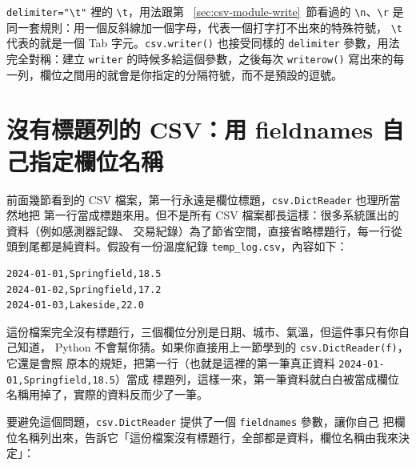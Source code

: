 
\texttt{delimiter="\textbackslash t"} 裡的 \texttt{\textbackslash t}，用法跟第
~\ref{sec:csv-module-write}~節看過的 \texttt{\textbackslash n}、\texttt{\textbackslash r}
是同一套規則：用一個反斜線加一個字母，代表一個打字打不出來的特殊符號，
\texttt{\textbackslash t} 代表的就是一個 Tab 字元。\texttt{csv.writer()} 也接受同樣的
\texttt{delimiter}
參數，用法完全對稱：建立 \texttt{writer} 的時候多給這個參數，之後每次 \texttt{writerow()}
寫出來的每一列，欄位之間用的就會是你指定的分隔符號，而不是預設的逗號。


\section{沒有標題列的 CSV：用 fieldnames 自己指定欄位名稱}
\label{sec:csv-no-header}

前面幾節看到的 CSV 檔案，第一行永遠是欄位標題，\texttt{csv.DictReader} 也理所當然地把
第一行當成標題來用。但不是所有 CSV 檔案都長這樣：很多系統匯出的資料（例如感測器記錄、
交易紀錄）為了節省空間，直接省略標題行，每一行從頭到尾都是純資料。假設有一份溫度紀錄
\texttt{temp\_log.csv}，內容如下：

\begin{verbatim}
2024-01-01,Springfield,18.5
2024-01-02,Springfield,17.2
2024-01-03,Lakeside,22.0
\end{verbatim}

這份檔案完全沒有標題行，三個欄位分別是日期、城市、氣溫，但這件事只有你自己知道，
Python 不會幫你猜。如果你直接用上一節學到的 \texttt{csv.DictReader(f)}，它還是會照
原本的規矩，把第一行（也就是這裡的第一筆真正資料 \texttt{2024-01-01,Springfield,18.5}）當成
標題列，這樣一來，第一筆資料就白白被當成欄位名稱用掉了，實際的資料反而少了一筆。

要避免這個問題，\texttt{csv.DictReader} 提供了一個 \texttt{fieldnames} 參數，讓你自己
把欄位名稱列出來，告訴它「這份檔案沒有標題行，全部都是資料，欄位名稱由我來決定」：

